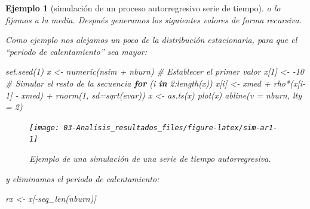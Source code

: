 \documentclass[
]{book}
\newenvironment{Shaded}{\begin{snugshade}}{\end{snugshade}}
\newcommand{\AttributeTok}[1]{\textcolor[rgb]{0.77,0.63,0.00}{#1}}
\newcommand{\CommentTok}[1]{\textcolor[rgb]{0.56,0.35,0.01}{\textit{#1}}}
\newcommand{\ControlFlowTok}[1]{\textcolor[rgb]{0.13,0.29,0.53}{\textbf{#1}}}
\newcommand{\DecValTok}[1]{\textcolor[rgb]{0.00,0.00,0.81}{#1}}
\newcommand{\FunctionTok}[1]{\textcolor[rgb]{0.00,0.00,0.00}{#1}}
\newcommand{\NormalTok}[1]{#1}
\newcommand{\OtherTok}[1]{\textcolor[rgb]{0.56,0.35,0.01}{#1}}
\newcommand{\SpecialCharTok}[1]{\textcolor[rgb]{0.00,0.00,0.00}{#1}}
\theoremstyle{break}
\newtheorem{example}{Ejemplo}[chapter]
\theoremstyle{nonumberplain}
\begin{document}
\begin{example}[simulación de un proceso autorregresivo serie de tiempo]
o lo fijamos a la media.
Después generamos los siguientes valores de forma recursiva.

Como ejemplo nos alejamos un poco de la distribución estacionaria, para que el ``periodo de calentamiento'' sea mayor:

\begin{Shaded}
\begin{Highlighting}[]
\FunctionTok{set.seed}\NormalTok{(}\DecValTok{1}\NormalTok{)}
\NormalTok{x }\OtherTok{\textless{}{-}} \FunctionTok{numeric}\NormalTok{(nsim }\SpecialCharTok{+}\NormalTok{ nburn)}
\CommentTok{\# Establecer el primer valor }
\NormalTok{x[}\DecValTok{1}\NormalTok{] }\OtherTok{\textless{}{-}} \SpecialCharTok{{-}}\DecValTok{10}
\CommentTok{\# Simular el resto de la secuencia}
\ControlFlowTok{for}\NormalTok{ (i }\ControlFlowTok{in} \DecValTok{2}\SpecialCharTok{:}\FunctionTok{length}\NormalTok{(x))}
\NormalTok{  x[i] }\OtherTok{\textless{}{-}}\NormalTok{ xmed }\SpecialCharTok{+}\NormalTok{ rho}\SpecialCharTok{*}\NormalTok{(x[i}\DecValTok{{-}1}\NormalTok{] }\SpecialCharTok{{-}}\NormalTok{ xmed) }\SpecialCharTok{+} \FunctionTok{rnorm}\NormalTok{(}\DecValTok{1}\NormalTok{, }\AttributeTok{sd=}\FunctionTok{sqrt}\NormalTok{(evar))}
\NormalTok{x }\OtherTok{\textless{}{-}} \FunctionTok{as.ts}\NormalTok{(x)}
\FunctionTok{plot}\NormalTok{(x)}
\FunctionTok{abline}\NormalTok{(}\AttributeTok{v =}\NormalTok{ nburn, }\AttributeTok{lty =} \DecValTok{2}\NormalTok{)}
\end{Highlighting}
\end{Shaded}

\begin{figure}[!htb]

{\centering \texttt{[image: 03-Analisis\_resultados\_files/figure-latex/sim-ar1-1]} 

}

\caption{Ejemplo de una simulación de una serie de tiempo autorregresiva.}\label{fig:sim-ar1}
\end{figure}

y eliminamos el periodo de calentamiento:

\begin{Shaded}
\begin{Highlighting}[]
\NormalTok{rx }\OtherTok{\textless{}{-}}\NormalTok{ x[}\SpecialCharTok{{-}}\FunctionTok{seq\_len}\NormalTok{(nburn)]}
\end{Highlighting}
\end{Shaded}

\end{example}
\end{document}

